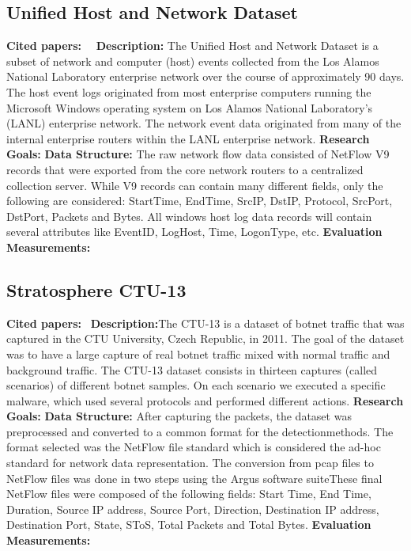 \subsection{Unified Host and Network Dataset}
\textbf{Cited papers:}~\cite{turcotte17}~\cite{turcotte2017unified} \newline
\textbf{Description:} The Unified Host and Network Dataset is a subset of network and computer (host) events collected from the Los Alamos National Laboratory enterprise network over the course of approximately 90 days. The host event logs originated from most enterprise computers running the Microsoft Windows operating system on Los Alamos National Laboratory's (LANL) enterprise network. The network event data originated from many of the internal enterprise routers within the LANL enterprise network. \newline
\textbf{Research Goals:}  \newline
\textbf{Data Structure:} The raw network flow data consisted of NetFlow V9 records that were exported from the core network routers to a centralized collection server. While V9 records can contain many different fields, only
the following are considered: StartTime, EndTime, SrcIP, DstIP, Protocol, SrcPort, DstPort, Packets and
Bytes. All windows host log data records will contain several attributes like EventID, LogHost, Time, LogonType, etc.  \newline
\textbf{Evaluation Measurements:} \newline


\subsection{Stratosphere CTU-13}
\textbf{Cited papers:}~\cite{garcia2014empirical} \newline
\textbf{Description:}The CTU-13 is a dataset of botnet traffic that was captured in the CTU University, Czech Republic, in 2011. The goal of the dataset was to have a large capture of real botnet traffic mixed with normal traffic and background traffic. The CTU-13 dataset consists in thirteen captures (called scenarios) of different botnet samples. On each scenario we executed a specific malware, which used several protocols and performed different actions.\newline
\textbf{Research Goals:}  \newline
\textbf{Data Structure:} After capturing the packets, the dataset was preprocessed and
converted to a common format for the detectionmethods. The format selected was the NetFlow file standard
which is considered the ad-hoc standard for network data
representation. The conversion from pcap files to NetFlow
files was done in two steps using the Argus software suiteThese final NetFlow files were composed of the following fields: Start Time, End Time, Duration, Source IP address, Source Port, Direction, Destination IP address, Destination Port, State, SToS, Total Packets
and Total Bytes. \newline
\textbf{Evaluation Measurements:} \newline


